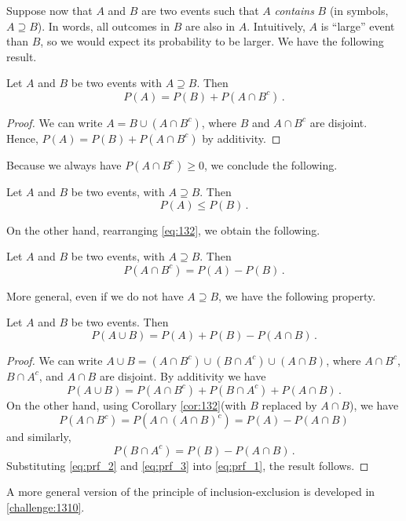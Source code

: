 Suppose now that $A$ and $B$ are two events such that $A$ \emph{contains} $B$ (in symbols, $A \supseteq B$).
In words, all outcomes in $B$ are also in $A$. Intuitively, $A$ is ``large'' event than $B$, so we would expect its
probability to be larger.
We have the following result.
\begin{theorem}
    Let $A$ and $B$ be two events with $A \supseteq B$. Then
    \begin{equation}
        \label{eq:132}
        P(A) = P(B)+P(A \cap B^c)\,.
    \end{equation}
\end{theorem}
\begin{proof}
    We can write $A=B\cup (A \cap B^c)$, where $B$ and $A \cap B^c$ are disjoint. Hence, $P(A)=P(B)+P(A\cap B^c)$ by
    additivity.
\end{proof}
Because we always have $P(A \cap B^c)\geqslant 0$, we conclude the following.
\begin{corollary}
    Let $A$ and $B$ be two events, with $ A \supseteq B$. Then
    $$
    P(A) \leqslant P(B)\,.
    $$
\end{corollary}
On the other hand, rearranging \autoref{eq:132}, we obtain the following.
\begin{corollary}\label{cor:132}
    Let $A$ and $B$ be two events, with $A \supseteq B$. Then
    \begin{equation}
        P(A \cap B^c) = P(A) - P(B)\,.
    \end{equation}
\end{corollary}

More general, even if we do not have $A \supseteq B$, we have the following property.

\begin{theorem}
    Let $A$ and $B$ be two events. Then
    \begin{equation}
        P(A \cup B) = P(A) + P(B) - P(A \cap B)\,.
    \end{equation}
\end{theorem}
\begin{proof}
    We can write $A\cup B = (A \cap B^c) \cup (B \cap A^c) \cup (A \cap B)$, where  $A\cap B^c$, $B \cap A^c$, and
    $A\cap B$ are disjoint. By additivity we have
    \begin{equation}\label{eq:prf_1}
        P(A\cup B) = P(A\cap B^c) + P(B \cap A^c)+P(A \cap B)\,.
    \end{equation}
    On the other hand, using Corollary \autoref{cor:132}(with $B$ replaced by $A \cap B$), we have
    \begin{equation}\label{eq:prf_2}
        P(A \cap B^c) = P(A \cap (A \cap B)^c) = P(A) - P(A \cap B)
    \end{equation}
    and similarly,
    \begin{equation}\label{eq:prf_3}
        P(B \cap A^c) = P(B) - P(A \cap B)\,.
    \end{equation}
    Substituting \autoref{eq:prf_2} and \autoref{eq:prf_3} into \autoref{eq:prf_1}, the result follows.
\end{proof}
A more general version of the principle of inclusion-exclusion is developed in \autoref{challenge:1310}.

